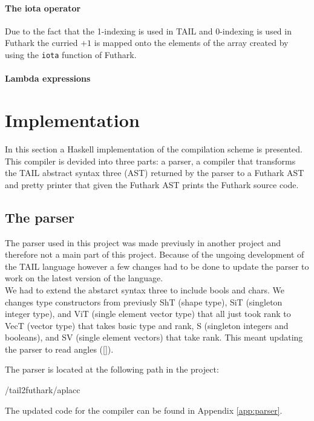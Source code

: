 \documentclass[11pt]{article}
\begin{document}
\paragraph{The iota operator} 
Due to the fact that the 1-indexing is used in TAIL and 0-indexing is used in Futhark the curried $+1$ is mapped onto the elements of the array created by using the {\tt iota} function of Futhark. 

\paragraph{Lambda expressions} 

\section{Implementation}
\label{sec:impl}
In this section a Haskell implementation of the compilation scheme is presented. This compiler is devided into three parts: a parser, a compiler that transforms the TAIL abstract syntax three (AST) returned by the parser to a Futhark AST and pretty printer that given the Futhark AST prints the Futhark source code. 

\subsection{The parser}
The parser used in this project was made previusly in another project \cite{APLACC} and therefore not a main part of this project. Because of the ungoing development of the TAIL language however a few changes had to be done to update the parser to work on the latest version of the language. \\

We had to extend the abstarct syntax three to include bools and chars. 
We changes type constructors from previusly ShT (shape type), SiT (singleton integer type), and ViT (single element vector type) that all just took rank
to VecT (vector type) that takes basic type and rank, S (singleton integers and booleans), and SV (single element vectors) that take rank. 
This meant updating the parser to read angles ([]).

The parser is located at the following path in the project: 

/tail2futhark/aplacc

The updated code for the compiler can be found in Appendix \ref{app:parser}.
\end{document}
